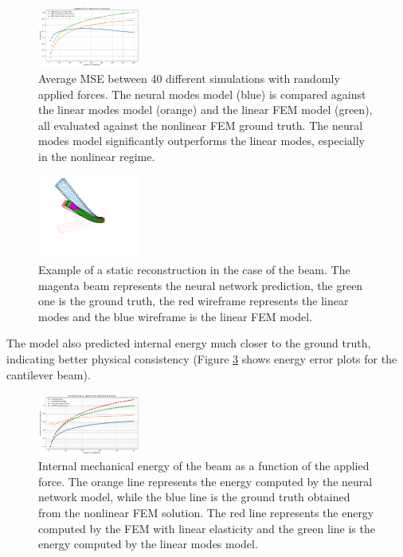 \documentclass[11pt,a4paper,twocolumn]{article}
\begin{document}
\begin{figure}[H]
    \centering
    \includegraphics[width=0.3\textwidth]{Images/beam_static_mse.png}
    \caption{Average MSE between 40 different simulations with randomly applied forces. The neural modes model (blue) is compared against the linear modes model (orange) and the linear FEM model (green), all evaluated against the nonlinear FEM ground truth. The neural modes model significantly outperforms the linear modes, especially in the nonlinear regime.}
    \label{fig:static_mse_comparison}
\end{figure}

\begin{figure}[H]
    \centering
    \includegraphics[width=0.3\textwidth]{Images/sofa_example_beam.png}
    \caption{Example of a static reconstruction in the case of the beam. The magenta beam represents the neural network prediction, the green one is the ground truth, the red wireframe represents the linear modes and the blue wireframe is the linear FEM model.}
    \label{fig:static_rmse_distribution}
\end{figure}

The model also predicted internal energy much closer to the ground truth, indicating better physical consistency (Figure \ref{fig:static_energy_beam} shows energy error plots for the cantilever beam).

\begin{figure}[H]
    \centering
    \includegraphics[width=0.3\textwidth]{Images/beam_static_energy.png}
    \caption{Internal mechanical energy of the beam as a function of the applied force. The orange line represents the energy computed by the neural network model, while the blue line is the ground truth obtained from the nonlinear FEM solution. The red line represents the energy computed by the FEM with linear elasticity and the green line is the energy computed by the linear modes model.}
    \label{fig:static_energy_beam}
\end{figure}
\end{document}
